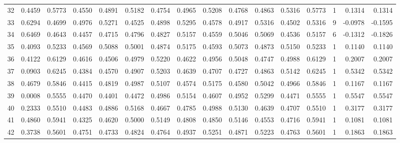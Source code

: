 \begin{tabular}{lrrrrrrrrrrrrrrr}
32  &      0.4459 &  0.5773 &  0.4550 &  0.4891 &  0.5182 &  0.4754 &  0.4965 &  0.5208 &  0.4768 &  0.4863 &   0.5316 &     0.5773 &      1 &                    0.1314 &                     0.1314 \\
33  &      0.6294 &  0.4699 &  0.4976 &  0.5271 &  0.4525 &  0.4898 &  0.5295 &  0.4578 &  0.4917 &  0.5316 &   0.4502 &     0.5316 &      9 &                   -0.0978 &                    -0.1595 \\
34  &      0.6469 &  0.4643 &  0.4457 &  0.4715 &  0.4796 &  0.4827 &  0.5157 &  0.4559 &  0.5046 &  0.5069 &   0.4536 &     0.5157 &      6 &                   -0.1312 &                    -0.1826 \\
35  &      0.4093 &  0.5233 &  0.4569 &  0.5088 &  0.5001 &  0.4874 &  0.5175 &  0.4593 &  0.5073 &  0.4873 &   0.5150 &     0.5233 &      1 &                    0.1140 &                     0.1140 \\
36  &      0.4122 &  0.6129 &  0.4616 &  0.4506 &  0.4979 &  0.5220 &  0.4622 &  0.4956 &  0.5048 &  0.4747 &   0.4988 &     0.6129 &      1 &                    0.2007 &                     0.2007 \\
37  &      0.0903 &  0.6245 &  0.4384 &  0.4570 &  0.4907 &  0.5203 &  0.4639 &  0.4707 &  0.4727 &  0.4863 &   0.5142 &     0.6245 &      1 &                    0.5342 &                     0.5342 \\
38  &      0.4679 &  0.5846 &  0.4415 &  0.4819 &  0.4987 &  0.5107 &  0.4574 &  0.5175 &  0.4580 &  0.5042 &   0.4966 &     0.5846 &      1 &                    0.1167 &                     0.1167 \\
39  &      0.0008 &  0.5555 &  0.4470 &  0.4401 &  0.4472 &  0.4986 &  0.5154 &  0.4607 &  0.4952 &  0.5299 &   0.4471 &     0.5555 &      1 &                    0.5547 &                     0.5547 \\
40  &      0.2333 &  0.5510 &  0.4483 &  0.4886 &  0.5168 &  0.4667 &  0.4785 &  0.4988 &  0.5130 &  0.4639 &   0.4707 &     0.5510 &      1 &                    0.3177 &                     0.3177 \\
41  &      0.4860 &  0.5941 &  0.4325 &  0.4620 &  0.5000 &  0.5149 &  0.4808 &  0.4850 &  0.5146 &  0.4553 &   0.4716 &     0.5941 &      1 &                    0.1081 &                     0.1081 \\
42  &      0.3738 &  0.5601 &  0.4751 &  0.4733 &  0.4824 &  0.4764 &  0.4937 &  0.5251 &  0.4871 &  0.5223 &   0.4763 &     0.5601 &      1 &                    0.1863 &                     0.1863 \\

\end{tabular}
